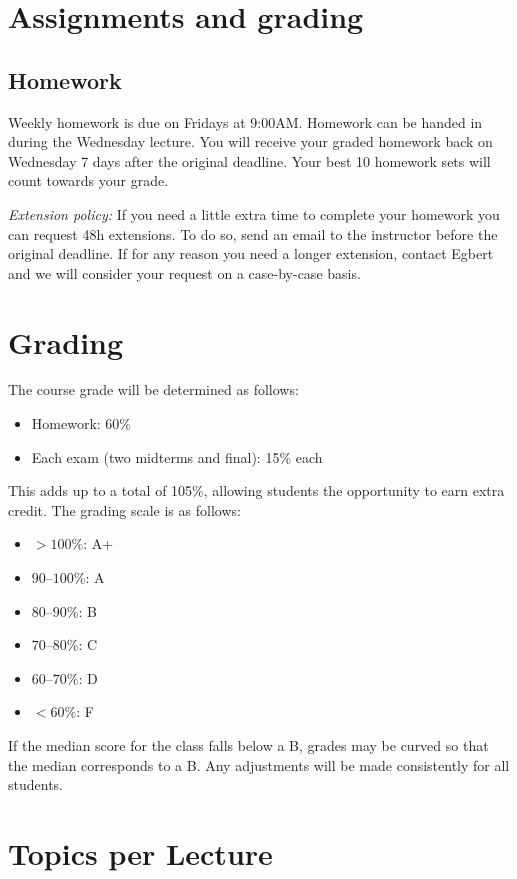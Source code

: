 \documentclass{article}
\begin{document}
\section*{Assignments and grading}

\subsection*{Homework}

Weekly homework is due on Fridays at 9:00AM. Homework can be handed in during the Wednesday lecture. You will receive your graded homework back on Wednesday 7 days after the original deadline. Your best 10 homework sets will count towards your grade.

\emph{Extension policy:} If you need a little extra time to complete your homework you can request 48h extensions. To do so, send an email to the instructor before the original deadline. If for any reason you need a longer extension, contact Egbert and we will consider your request on a case-by-case basis.

\section*{Grading}
The course grade will be determined as follows:

\begin{itemize}
    \item Homework: 60\%
    \item Each exam (two midterms and final): 15\% each
\end{itemize}

This adds up to a total of 105\%, allowing students the opportunity to earn extra credit. The grading scale is as follows:

\begin{itemize}
    \item $>100\%$: A+
    \item $90$--$100\%$: A
    \item $80$--$90\%$: B
    \item $70$--$80\%$: C
    \item $60$--$70\%$: D
    \item $<60\%$: F
\end{itemize}

If the median score for the class falls below a B, grades may be curved so that the median corresponds to a B. Any adjustments will be made consistently for all students.

\section{Topics per Lecture}
\end{document}
